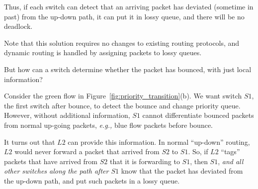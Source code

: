 Thus, if each switch can detect that an arriving packet has deviated (sometime
in past) from the up-down path, it can put it in lossy queue, and there will be
no deadlock.

Note that this solution requires no changes to existing routing protocols, and
dynamic routing is handled by assigning packets to lossy queues.

But how can a switch determine whether the packet has bounced, with just local
information?


Consider the green flow in Figure~\ref{fig:priority_transition}(b).  We
want switch $S1$, the first switch after bounce, to detect the bounce and change
priority queue. However, without additional information, $S1$ cannot
differentiate bounced packets from normal up-going packets, {\em e.g.,} blue
flow packets before bounce. 

It turns out that $L2$ can provide this information.  In normal ``up-down''
routing, $L2$ would never forward a packet that arrived from $S2$ to $S1$. So,
if $L2$ ``tags'' packets that have arrived from $S2$ that it is forwarding to $S1$,
then $S1$, {\em and all other switches along the path after $S1$} know that the
packet has deviated from the up-down path, and put such packets in a lossy queue. 

